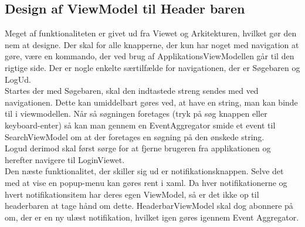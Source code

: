 \documentclass[SoftwareDesign/SoftwareDesign_main.tex]{subfiles}
\begin{document}
\subsection{Design af ViewModel til Header baren}
Meget af funktionaliteten er givet ud fra Viewet og Arkitekturen, hvilket gør den nem at designe. Der skal for alle knapperne, der kun har noget med navigation at gøre, være en kommando, der ved brug af ApplikationsViewModellen går til den rigtige side. Der er nogle enkelte særtilfælde for navigationen, der er Søgebaren og LogUd.\\

Startes der med Søgebaren, skal den indtastede streng sendes med ved navigationen. Dette kan umiddelbart gøres ved, at have en string, man kan binde til i viewmodellen. Når så søgningen foretages (tryk på søg knappen eller keyboard-enter) så kan man gennem en EventAggregator smide et event til SearchViewModel om at der foretages en søgning  på den ønskede string.\\

Logud derimod skal først sørge for at fjerne brugeren fra applikationen og herefter navigere til LoginViewet.\\

Den næste funktionalitet, der skiller sig ud er notifikationsknappen. Selve det med at vise en popup-menu kan gøres rent i xaml. Da hver notifikationerne og hvert notifikationsitem har deres egen ViewModel, så er det ikke op til headerbaren at tage hånd om dette. HeaderbarViewModel skal dog abonnere på om, der er en ny ulæst notifikation, hvilket igen gøres igennem Event Aggregator.
\end{document}
